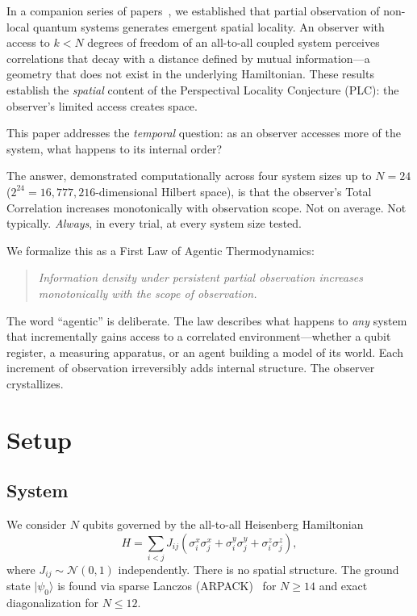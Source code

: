 \documentclass[aps,pra,twocolumn,superscriptaddress,floatfix]{revtex4-2}
\begin{document}
In a companion series of papers~\cite{glass2026plc1,glass2026plc2,glass2026plc3,glass2026plc4,glass2026plc5}, we established that partial observation of non-local quantum systems generates emergent spatial locality.
An observer with access to $k < N$ degrees of freedom of an all-to-all coupled system perceives correlations that decay with a distance defined by mutual information---a geometry that does not exist in the underlying Hamiltonian.
These results establish the \emph{spatial} content of the Perspectival Locality Conjecture (PLC): the observer's limited access creates space.

This paper addresses the \emph{temporal} question: as an observer accesses more of the system, what happens to its internal order?

The answer, demonstrated computationally across four system sizes up to $N = 24$ ($2^{24} = 16{,}777{,}216$-dimensional Hilbert space), is that the observer's Total Correlation increases monotonically with observation scope.
Not on average. Not typically. \emph{Always}, in every trial, at every system size tested.

We formalize this as a First Law of Agentic Thermodynamics:
\begin{quote}
\emph{Information density under persistent partial observation increases monotonically with the scope of observation.}
\end{quote}

The word ``agentic'' is deliberate.
The law describes what happens to \emph{any} system that incrementally gains access to a correlated environment---whether a qubit register, a measuring apparatus, or an agent building a model of its world.
Each increment of observation irreversibly adds internal structure.
The observer crystallizes.


\section{Setup}

\subsection{System}

We consider $N$ qubits governed by the all-to-all Heisenberg Hamiltonian
\begin{equation}
H = \sum_{i<j} J_{ij} \left(\sigma^x_i \sigma^x_j + \sigma^y_i \sigma^y_j + \sigma^z_i \sigma^z_j\right),
\label{eq:hamiltonian}
\end{equation}
where $J_{ij} \sim \mathcal{N}(0,1)$ independently.
There is no spatial structure.
The ground state $|\psi_0\rangle$ is found via sparse Lanczos (ARPACK)~\cite{lehoucq1998} for $N \geq 14$ and exact diagonalization for $N \leq 12$.
\end{document}
